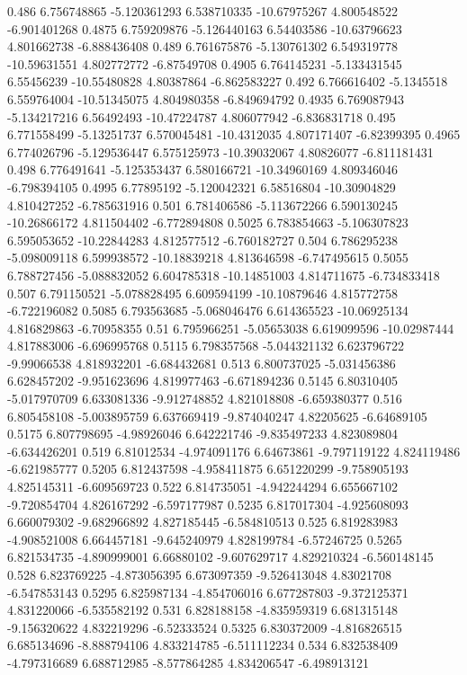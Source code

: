 {0.486 6.756748865 -5.120361293 6.538710335 -10.67975267 4.800548522 -6.901401268
0.4875 6.759209876 -5.126440163 6.54403586 -10.63796623 4.801662738 -6.888436408
0.489 6.761675876 -5.130761302 6.549319778 -10.59631551 4.802772772 -6.87549708
0.4905 6.764145231 -5.133431545 6.55456239 -10.55480828 4.80387864 -6.862583227
0.492 6.766616402 -5.1345518 6.559764004 -10.51345075 4.804980358 -6.849694792
0.4935 6.769087943 -5.134217216 6.56492493 -10.47224787 4.806077942 -6.836831718
0.495 6.771558499 -5.13251737 6.570045481 -10.4312035 4.807171407 -6.82399395
0.4965 6.774026796 -5.129536447 6.575125973 -10.39032067 4.80826077 -6.811181431
0.498 6.776491641 -5.125353437 6.580166721 -10.34960169 4.809346046 -6.798394105
0.4995 6.77895192 -5.120042321 6.58516804 -10.30904829 4.810427252 -6.785631916
0.501 6.781406586 -5.113672266 6.590130245 -10.26866172 4.811504402 -6.772894808
0.5025 6.783854663 -5.106307823 6.595053652 -10.22844283 4.812577512 -6.760182727
0.504 6.786295238 -5.098009118 6.599938572 -10.18839218 4.813646598 -6.747495615
0.5055 6.788727456 -5.088832052 6.604785318 -10.14851003 4.814711675 -6.734833418
0.507 6.791150521 -5.078828495 6.609594199 -10.10879646 4.815772758 -6.722196082
0.5085 6.793563685 -5.068046476 6.614365523 -10.06925134 4.816829863 -6.70958355
0.51 6.795966251 -5.05653038 6.619099596 -10.02987444 4.817883006 -6.696995768
0.5115 6.798357568 -5.044321132 6.623796722 -9.99066538 4.818932201 -6.684432681
0.513 6.800737025 -5.031456386 6.628457202 -9.951623696 4.819977463 -6.671894236
0.5145 6.80310405 -5.017970709 6.633081336 -9.912748852 4.821018808 -6.659380377
0.516 6.805458108 -5.003895759 6.637669419 -9.874040247 4.82205625 -6.64689105
0.5175 6.807798695 -4.98926046 6.642221746 -9.835497233 4.823089804 -6.634426201
0.519 6.81012534 -4.974091176 6.64673861 -9.797119122 4.824119486 -6.621985777
0.5205 6.812437598 -4.958411875 6.651220299 -9.758905193 4.825145311 -6.609569723
0.522 6.814735051 -4.942244294 6.655667102 -9.720854704 4.826167292 -6.597177987
0.5235 6.817017304 -4.925608093 6.660079302 -9.682966892 4.827185445 -6.584810513
0.525 6.819283983 -4.908521008 6.664457181 -9.645240979 4.828199784 -6.57246725
0.5265 6.821534735 -4.890999001 6.66880102 -9.607629717 4.829210324 -6.560148145
0.528 6.823769225 -4.873056395 6.673097359 -9.526413048 4.83021708 -6.547853143
0.5295 6.825987134 -4.854706016 6.677287803 -9.372125371 4.831220066 -6.535582192
0.531 6.828188158 -4.835959319 6.681315148 -9.156320622 4.832219296 -6.52333524
0.5325 6.830372009 -4.816826515 6.685134696 -8.888794106 4.833214785 -6.511112234
0.534 6.832538409 -4.797316689 6.688712985 -8.577864285 4.834206547 -6.498913121
}

